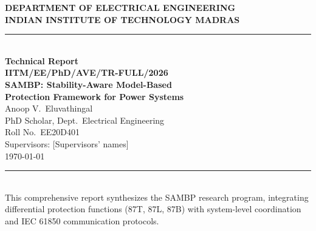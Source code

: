 \documentclass[12pt,a4paper]{article}
\begin{document}

\begin{titlepage}
  \begin{center}
    \vspace*{1.5cm}
    {\large \textbf{DEPARTMENT OF ELECTRICAL ENGINEERING}}\\[0.3cm]
    {\large \textbf{INDIAN INSTITUTE OF TECHNOLOGY MADRAS}}\\[0.3cm]
    \rule{\linewidth}{1pt}\\[0.6cm]

    {\LARGE \textbf{Technical Report}}\\[0.4cm]
    {\Large \textbf{IITM/EE/PhD/AVE/TR-FULL/2026}}\\[1.5cm]

    {\huge \bfseries
     SAMBP: Stability-Aware Model-Based\\[0.3cm]
     Protection Framework for Power Systems}\\[1.5cm]

    {\large Anoop V.\ Eluvathingal}\\[0.2cm]
    {\normalsize PhD Scholar, Dept.\ Electrical Engineering}\\[0.1cm]
    {\normalsize Roll No.\ EE20D401}\\[1.0cm]

    {\normalsize Supervisors: [Supervisors' names]}\\[0.2cm]
    {\normalsize \today}\\[1.0cm]

    \rule{\linewidth}{1pt}\\[0.4cm]
    {\small This comprehensive report synthesizes the SAMBP research program,
    integrating differential protection functions (87T, 87L, 87B) with
    system-level coordination and IEC 61850 communication protocols.}
  \end{center}
\end{titlepage}
\end{document}
